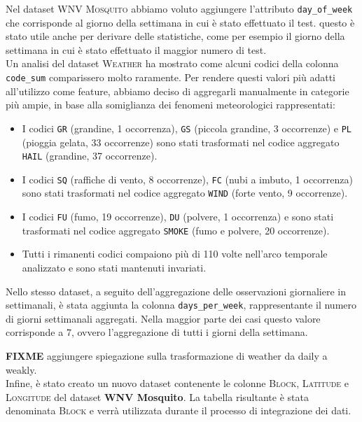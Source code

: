 Nel dataset \textsc{WNV Mosquito} abbiamo voluto aggiungere l'attributo 
\texttt{day\_of\_week} che corrisponde al giorno della settimana in cui è stato 
effettuato il test. questo è stato utile anche per derivare delle statistiche, 
come per esempio il giorno della settimana in cui è stato effettuato il maggior 
numero di test. 
\\

Un analisi del dataset \textsc{Weather} ha mostrato come alcuni codici della 
colonna \texttt{code\_sum} comparissero molto raramente. Per rendere questi 
valori più adatti all'utilizzo come feature, abbiamo deciso di aggregarli 
manualmente in categorie più ampie, in base alla somiglianza dei fenomeni 
meteorologici rappresentati:
\begin{itemize}
	\item I codici \texttt{GR} (grandine, 1 occorrenza), \texttt{GS} (piccola 
	grandine, 3 occorrenze) e \texttt{PL} (pioggia gelata, 33 occorrenze) sono 
	stati trasformati nel codice aggregato \texttt{HAIL} (grandine, 37 
	occorrenze).
	
	\item I codici \texttt{SQ} (raffiche di vento, 8 occorrenze), \texttt{FC} 
	(nubi a imbuto, 1 occorrenza) sono stati trasformati nel codice aggregato 
	\texttt{WIND} (forte vento, 9 occorrenze).
	
	\item I codici \texttt{FU} (fumo, 19 occorrenze), \texttt{DU} (polvere, 1 
	occorrenza) e sono stati trasformati nel codice aggregato \texttt{SMOKE} 
	(fumo e polvere, 20 occorrenze).
	
	\item Tutti i rimanenti codici compaiono più di 110 volte nell'arco 
	temporale analizzato e sono stati mantenuti invariati.
\end{itemize}

Nello stesso dataset, a seguito dell'aggregazione delle osservazioni 
giornaliere in settimanali, è stata aggiunta la colonna 
\texttt{days\_per\_week}, rappresentante il numero di giorni settimanali 
aggregati. Nella maggior parte dei casi questo valore corrisponde a 7, ovvero 
l'aggregazione di tutti i giorni della settimana.

\textbf{FIXME} aggiungere spiegazione sulla trasformazione di weather da daily 
a weakly.\\


Infine, è stato creato un nuovo dataset contenente le colonne \textsc{Block}, 
\textsc{Latitude} e \textsc{Longitude} del dataset \textbf{WNV Mosquito}. La 
tabella risultante è stata denominata \textsc{Block} e verrà utilizzata durante 
il processo di integrazione dei dati.
